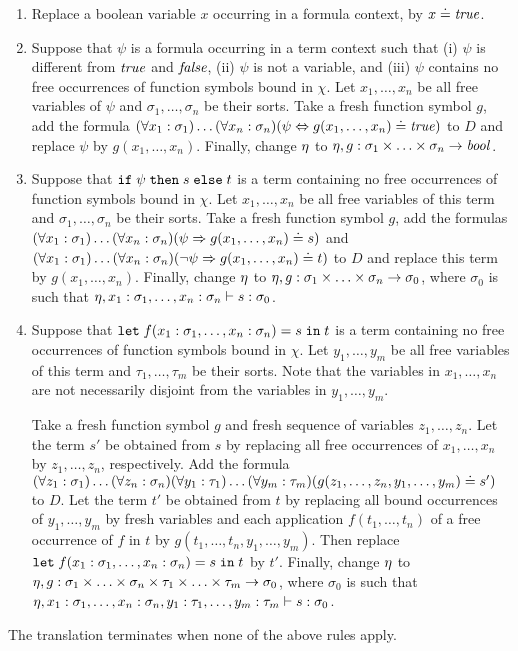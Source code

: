 \begin{enumerate}
  \item Replace a boolean variable $x$ occurring in a formula context, by $x \doteq \mathit{true}$.

  \item Suppose that $\psi$ is a formula occurring in a term context such that (i) $\psi$ is different from $\mathit{true}$ and $\mathit{false}$, (ii) $\psi$ is not a variable, and (iii) $\psi$ contains no free occurrences of function symbols bound in $\chi$. Let $x_1,\ldots,x_n$ be all free variables of $\psi$ and $\sigma_1,\ldots,\sigma_n$ be their sorts. Take a fresh function symbol $g$, add the formula $(\forall x_1:\sigma_1)\ldots(\forall x_n:\sigma_n) (\psi \Leftrightarrow g(x_1,\ldots,x_n) \doteq \mathit{true})$ to $D$ and replace $\psi$ by $g(x_1,\ldots,x_n)$. Finally, change $\eta$ to $\eta,g : \sigma_1 \times \ldots \times \sigma_n \to \mathit{bool}$.

  \item Suppose that $\mathtt{if}\;{\psi}\;\allowbreak\mathtt{then}\;{s}\;\allowbreak\mathtt{else}\;{t}$ is a term containing no free occurrences of function symbols bound in $\chi$. Let $x_1,\ldots,x_n$ be all free variables of this term and $\sigma_1,\ldots,\sigma_n$ be their sorts. Take a fresh function symbol $g$, add the formulas $(\forall x_1:\sigma_1)\ldots(\forall x_n:\sigma_n) (\psi \Rightarrow g(x_1,\ldots,x_n) \doteq s)$ and $(\forall x_1:\sigma_1)\ldots(\forall x_n:\sigma_n) (\neg\psi \Rightarrow g(x_1,\ldots,x_n) \doteq t)$ to $D$ and replace this term by $g(x_1,\ldots,x_n)$. Finally, change $\eta$ to $\eta,g : \sigma_1 \times \ldots \times \sigma_n \to \sigma_0$, where $\sigma_0$ is such that $\eta,x_1:\sigma_1,\ldots,x_n:\sigma_n \vdash s : \sigma_0$.

  \item Suppose that $\mathtt{let}\;{f(x_1:\sigma_1, \ldots, x_n:\sigma_n)}={s}\;\allowbreak\mathtt{in}\;{t}$ is a term containing no free occurrences of function symbols bound in $\chi$. Let $y_1,\ldots,y_m$ be all free variables of this term and $\tau_1,\ldots,\tau_m$ be their sorts. Note that the variables in $x_1,\ldots,x_n$ are not necessarily disjoint from the variables in $y_1,\ldots,y_m$. 

Take a fresh function symbol $g$ and fresh sequence of variables $z_1,\ldots,z_n$. Let the term $s'$ be obtained from $s$ by replacing all free occurrences of $x_1,\ldots,x_n$ by $z_1,\ldots,z_n$, respectively. Add the formula $(\forall z_1:\sigma_1)\ldots(\forall z_n:\sigma_n) (\forall y_1:\tau_1)\ldots(\forall y_m:\tau_m) (g(z_1,\ldots,z_n,y_1,\ldots,\allowbreak y_m) \doteq s')$ to $D$. Let the term $t'$ be obtained from $t$ by replacing all bound occurrences of $y_1,\ldots,y_m$ by fresh variables and each application $f(t_1, \ldots, t_n)$ of a free occurrence of $f$ in $t$ by $g(t_1, \ldots, t_n,\allowbreak y_1, \ldots, y_m)$. Then replace $\mathtt{let}\;{f(x_1:\sigma_1, \ldots, x_n:\sigma_n)}={s}\;\allowbreak\mathtt{in}\;{t}$ by $t'$. Finally, change $\eta$ to $\eta,g : \sigma_1 \times \ldots \times \sigma_n \times \tau_1 \times \ldots \times \tau_m \to \sigma_0$, where $\sigma_0$ is such that $\eta,x_1:\sigma_1,\ldots,x_n:\sigma_n,y_1:\tau_1,\ldots,y_m:\tau_m \vdash s : \sigma_0$. 
\end{enumerate}
The translation terminates when none of the above rules apply.

